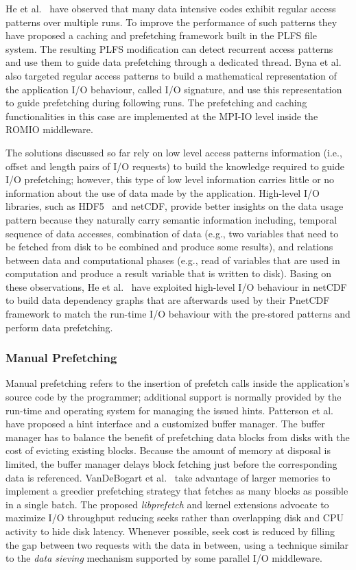 He et al.~\cite{HeBTAGGMCS13} have observed that many data intensive codes exhibit regular access patterns over multiple runs. To improve the performance of such patterns they have proposed a caching and prefetching framework built 
in the PLFS file system. The resulting PLFS modification can detect recurrent access patterns and use them to guide data prefetching through a dedicated thread. Byna et al.~\cite{Byna2008} also targeted regular access patterns to 
build a mathematical representation of the application I/O behaviour, called I/O signature, and use this representation to guide prefetching during following runs. The prefetching and caching functionalities in this case are 
implemented at the MPI-IO level inside the ROMIO middleware. 

The solutions discussed so far rely on low level access patterns information (i.e., offset and length pairs of I/O requests) to build the knowledge required to guide I/O prefetching; however, this type of low level information carries 
little or no information about the use of data made by the application. High-level I/O libraries, such as HDF5~\cite{Folk99} and netCDF, provide better insights on the data usage pattern because they naturally carry semantic information 
including, temporal sequence of data accesses, combination of data (e.g., two variables that need to be fetched from disk to be combined and produce some results), and relations between data and computational phases (e.g., read of 
variables that are used in computation and produce a result variable that is written to disk). Basing on these observations, He et al.~\cite{HEST12} have exploited high-level I/O behaviour in netCDF to build data dependency graphs that 
are afterwards used by their PnetCDF~\cite{li2003} framework to match the run-time I/O behaviour with the pre-stored patterns and perform data prefetching.

\subsubsection{Manual Prefetching}
Manual prefetching refers to the insertion of prefetch calls inside the application's source code by the programmer; additional support is normally provided by the run-time and operating system for managing the issued hints. 
Patterson et al.~\cite{Patterson1995} have proposed a hint interface and a customized buffer manager. The buffer manager has to balance the benefit of prefetching data blocks from disks with the cost of evicting existing blocks. 
Because the amount of memory at disposal is limited, the buffer manager delays block fetching just before the corresponding data is referenced. VanDeBogart et al.~\cite{VanDeBogartFK09} take advantage of larger memories to implement 
a greedier prefetching strategy that fetches as many blocks as possible in a single batch. The proposed \textit{libprefetch} and kernel extensions advocate to maximize I/O throughput reducing seeks rather than overlapping disk and 
CPU activity to hide disk latency. Whenever possible, seek cost is reduced by filling the gap between two requests with the data in between, using a technique similar to the \textit{data sieving} mechanism supported by some parallel 
I/O middleware.

